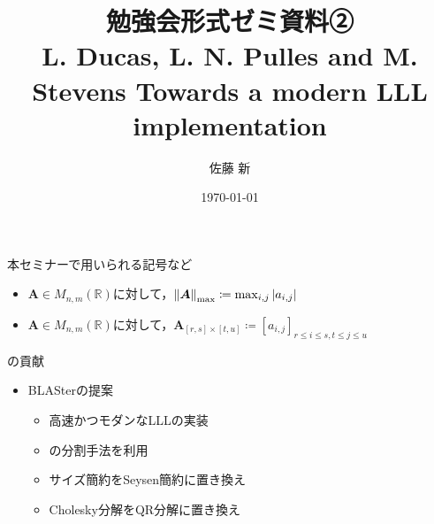 \documentclass[12pt,aspectratio=169,table,dvipdfmx, leqno]{beamer}
\title[勉強会]{勉強会形式ゼミ資料②\\L. Ducas, L. N. Pulles and M. Stevens Towards a modern LLL implementation\cite{DPS25}}
\author[佐藤]{佐藤 新}
\date{\today}
\begin{document}
\begin{frame}
    \maketitle
\end{frame}

\begin{frame}
    本セミナーで用いられる記号など
    \begin{itemize}
        \item $\bm{A}\in M_{n, m}(\mathbb{R})$に対して，$\norm{\bm{A}}_{\max}\coloneqq \max_{i, j}\abs{a_{i, j}}$
        \item $\bm{A}\in M_{n, m}(\mathbb{R})$に対して，$\bm{A}_{[r, s]\times [t, u]}\coloneqq [a_{i, j}]_{r\le i\le s, t\le j\le u}$
    \end{itemize}
\end{frame}

\begin{frame}{\cite{DPS25}の貢献}
    \begin{itemize}
        \item BLASterの提案
        \begin{itemize}
            \item 高速かつモダンなLLLの実装
            \item \cite{NS16}の分割手法を利用
            \item サイズ簡約をSeysen簡約に置き換え
            \item Cholesky分解をQR分解に置き換え
        \end{itemize}
    \end{itemize}
\end{frame}
\end{document}
